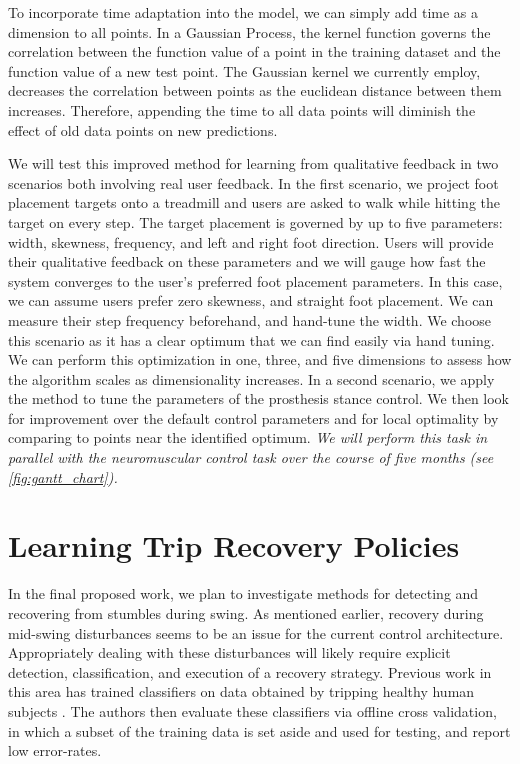 To incorporate time adaptation into the model, we can simply add time as a
dimension to all points. In a Gaussian Process, the kernel function governs the
correlation between the function value of a point in the training dataset and
the function value of a new test point. The Gaussian kernel we currently employ,
decreases the correlation between points as the euclidean distance between them
increases. Therefore, appending the time to all data points will diminish the
effect of old data points on new predictions.

We will test this improved method for learning from qualitative feedback in two
scenarios both involving real user feedback. In the first scenario, we project
foot placement targets onto a treadmill and users are asked to walk while
hitting the target on every step. The target placement is governed by up to five
parameters: width, skewness, frequency, and left and right foot direction. Users
will provide their qualitative feedback on these parameters and we will gauge
how fast the system converges to the user's preferred foot placement parameters.
In this case, we can assume users prefer zero skewness, and straight foot
placement. We can measure their step frequency beforehand, and hand-tune the
width. We choose this scenario as it has a clear optimum that we can find easily
via hand tuning. We can perform this optimization in one, three, and five
dimensions to assess how the algorithm scales as dimensionality increases.  In a
second scenario, we apply the method to tune the parameters of the prosthesis
stance control. We then look for improvement over the default control parameters
and for local optimality by comparing to points near the identified optimum.
\emph{We will perform this task in parallel with the neuromuscular control task
over the course of five months (see \cref{fig:gantt_chart}).}

\section{Learning Trip Recovery Policies}\label{sec:proposed_trip_class}

In the final proposed work, we plan to investigate methods for detecting and
recovering from stumbles during swing. As mentioned earlier, recovery during
mid-swing disturbances seems to be an issue for the current control
architecture.  Appropriately dealing with these disturbances will likely require
explicit detection, classification, and execution of a recovery strategy.
Previous work in this area has trained classifiers on data obtained by tripping
healthy human subjects \citep{lawson2010stumble, shirota2014recovery}. The
authors then evaluate these classifiers via offline cross validation, in which a
subset of the training data is set aside and used for testing, and report low
error-rates. 

